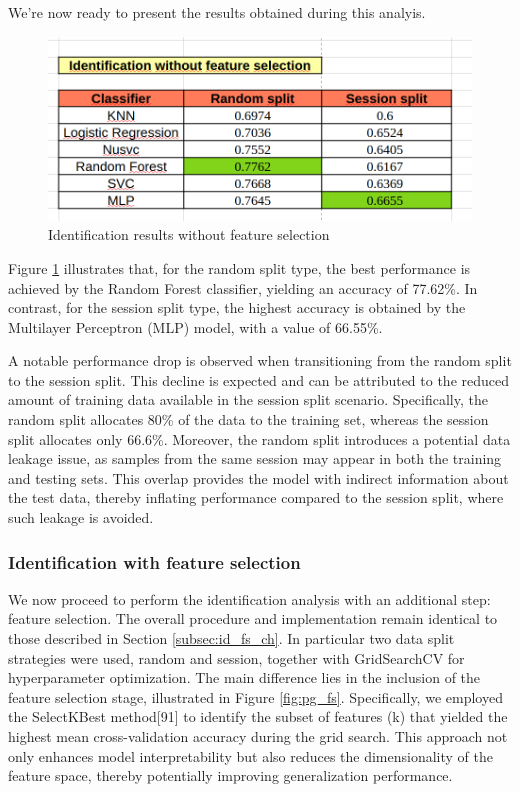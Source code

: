 \documentclass{article}
\begin{document}
We're now ready to present the results obtained during this analyis.

\begin{figure}[ht]
    \centering
    \includegraphics[width = 0.6
    \textwidth]{Images/Results/Identification/nofs.png}
    \caption{Identification results without feature selection}
    \label{fig:id_nofs}
\end{figure}

Figure \ref{fig:id_nofs} illustrates that, for the random split type, the best performance is achieved by the Random Forest classifier, yielding an accuracy of 77.62\%.
In contrast, for the session split type, the highest accuracy is obtained by the Multilayer Perceptron (MLP) model, with a value of 66.55\%.

A notable performance drop is observed when transitioning from the random split to the session split. 
This decline is expected and can be attributed to the reduced amount of training data available in the session split scenario. 
Specifically, the random split allocates 80\% of the data to the training set, whereas the session split allocates only 66.6\%.
Moreover, the random split introduces a potential data leakage issue, as samples from the same session may appear in both the training and testing sets. 
This overlap provides the model with indirect information about the test data, thereby inflating performance compared to the session split, where such leakage is avoided.

\subsubsection{Identification with feature selection}

We now proceed to perform the identification analysis with an additional step: feature selection.
The overall procedure and implementation remain identical to those described in Section \ref{subsec:id_fs_ch}.
In particular two data split strategies were used, random and session, together with GridSearchCV for hyperparameter optimization.
The main difference lies in the inclusion of the feature selection stage, illustrated in Figure \ref{fig:pg_fs}. 
Specifically, we employed the SelectKBest method[91] to identify the subset of features (k) that yielded the highest mean cross-validation accuracy during the grid search.
This approach not only enhances model interpretability but also reduces the dimensionality of the feature space, thereby potentially improving generalization performance.
\end{document}
